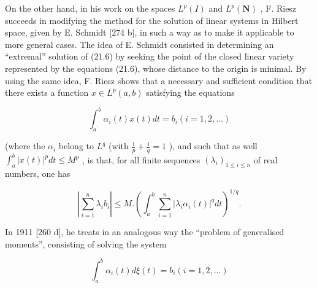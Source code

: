 On the other hand, in his work on the spaces \(L^{p}(I)\) and \(L^{p}(\mathbf{N})\) , F. Riesz succeeds in modifying the method for the solution of linear systems in Hilbert space, given by E. Schmidt {[}274 b{]}, in such a way as to make it applicable to more general cases. The idea of E. Schmidt consisted in determining an ``extremal'' solution of (21.6) by seeking the point of the closed linear variety represented by the equations (21.6), whose distance to the origin is minimal. By using the same idea, F. Riesz shows that a necessary and sufficient condition that there exists a function \(x \in L^{p}(a, b)\) satisfying the equations

\[
\int_ {a} ^ {b} \alpha_ {i} (t) x (t) d t = b _ {i} (i = 1, 2, \dots)\tag{21.9}
\]

(where the \(\alpha_{i}\) belong to \(L^{q}\) (with \(\frac{1}{p} +\frac{1}{q} = 1\) ), and such that as well \(\int_{a}^{b}|x(t)|^{p}dt\leq M^{p}\) , is that, for all finite sequences \((\lambda_i)_{1\leq i\leq n}\) of real numbers, one has

\[
\left| \sum_ {i = 1} ^ {n} \lambda_ {i} b _ {i} \right| \leq M. \left(\int_ {a} ^ {b} \sum_ {i = 1} ^ {n} | \lambda_ {i} \alpha_ {i} (t) | ^ {q} d t\right) ^ {1 / q}.\tag{21.10}
\]

In 1911 {[}260 d{]}, he treats in an analogous way the ``problem of generalised moments'', consisting of solving the system

\[
\int_ {a} ^ {b} \alpha_ {i} (t) d \xi (t) = b _ {i} (i = 1, 2, \dots)\tag{21.11}
\]

